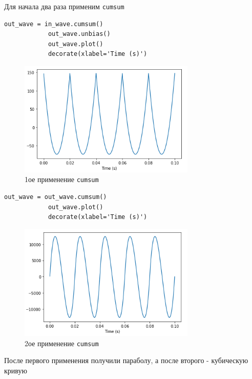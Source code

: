 \documentclass[a4paper,12pt]{article}
\begin{document}
\begin{enumerate}
		Для начала два раза применим \texttt{cumsum}
		\begin{lstlisting}[caption=1ое применение \texttt{cumsum}]
			out_wave = in_wave.cumsum()
			out_wave.unbias()
			out_wave.plot()
			decorate(xlabel='Time (s)')
		\end{lstlisting}
		\begin{figure}[H]
			\centering
			\includegraphics[width=0.75\textwidth]{4_2.png}
			\caption{1ое применение \texttt{cumsum}}
			\label{fig:4.2}
		\end{figure}
		\begin{lstlisting}[caption=2ое применение \texttt{cumsum}]
			out_wave = out_wave.cumsum()
			out_wave.plot()
			decorate(xlabel='Time (s)')
		\end{lstlisting}
		\begin{figure}[H]
			\centering
			\includegraphics[width=0.75\textwidth]{4_3.png}
			\caption{2ое применение \texttt{cumsum}}
			\label{fig:4.3}
		\end{figure}
		
		После первого применения получили параболу, а после второго - кубическую кривую
		

\end{enumerate}
\end{document}

